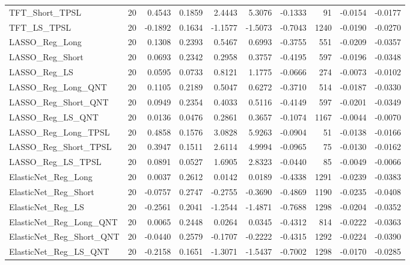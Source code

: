 \begin{tabular}{llrrrrrrrr}
\cline{1-10}
TFT\_Short\_TPSL & 20 & 0.4543 & 0.1859 & 2.4443 & 5.3076 & -0.1333 & 91 & -0.0154 & -0.0177 \\
\cline{1-10}
TFT\_LS\_TPSL & 20 & -0.1892 & 0.1634 & -1.1577 & -1.5073 & -0.7043 & 1240 & -0.0190 & -0.0270 \\
\cline{1-10}
LASSO\_Reg\_Long & 20 & 0.1308 & 0.2393 & 0.5467 & 0.6993 & -0.3755 & 551 & -0.0209 & -0.0357 \\
\cline{1-10}
LASSO\_Reg\_Short & 20 & 0.0693 & 0.2342 & 0.2958 & 0.3757 & -0.4195 & 597 & -0.0196 & -0.0348 \\
\cline{1-10}
LASSO\_Reg\_LS & 20 & 0.0595 & 0.0733 & 0.8121 & 1.1775 & -0.0666 & 274 & -0.0073 & -0.0102 \\
\cline{1-10}
LASSO\_Reg\_Long\_QNT & 20 & 0.1105 & 0.2189 & 0.5047 & 0.6272 & -0.3710 & 514 & -0.0187 & -0.0330 \\
\cline{1-10}
LASSO\_Reg\_Short\_QNT & 20 & 0.0949 & 0.2354 & 0.4033 & 0.5116 & -0.4149 & 597 & -0.0201 & -0.0349 \\
\cline{1-10}
LASSO\_Reg\_LS\_QNT & 20 & 0.0136 & 0.0476 & 0.2861 & 0.3657 & -0.1074 & 1167 & -0.0044 & -0.0070 \\
\cline{1-10}
LASSO\_Reg\_Long\_TPSL & 20 & 0.4858 & 0.1576 & 3.0828 & 5.9263 & -0.0904 & 51 & -0.0138 & -0.0166 \\
\cline{1-10}
LASSO\_Reg\_Short\_TPSL & 20 & 0.3947 & 0.1511 & 2.6114 & 4.9994 & -0.0965 & 75 & -0.0130 & -0.0162 \\
\cline{1-10}
LASSO\_Reg\_LS\_TPSL & 20 & 0.0891 & 0.0527 & 1.6905 & 2.8323 & -0.0440 & 85 & -0.0049 & -0.0066 \\
\cline{1-10}
ElasticNet\_Reg\_Long & 20 & 0.0037 & 0.2612 & 0.0142 & 0.0189 & -0.4338 & 1291 & -0.0239 & -0.0383 \\
\cline{1-10}
ElasticNet\_Reg\_Short & 20 & -0.0757 & 0.2747 & -0.2755 & -0.3690 & -0.4869 & 1190 & -0.0235 & -0.0408 \\
\cline{1-10}
ElasticNet\_Reg\_LS & 20 & -0.2561 & 0.2041 & -1.2544 & -1.4871 & -0.7688 & 1298 & -0.0204 & -0.0352 \\
\cline{1-10}
ElasticNet\_Reg\_Long\_QNT & 20 & 0.0065 & 0.2448 & 0.0264 & 0.0345 & -0.4312 & 814 & -0.0222 & -0.0363 \\
\cline{1-10}
ElasticNet\_Reg\_Short\_QNT & 20 & -0.0440 & 0.2579 & -0.1707 & -0.2222 & -0.4315 & 1292 & -0.0224 & -0.0390 \\
\cline{1-10}
ElasticNet\_Reg\_LS\_QNT & 20 & -0.2158 & 0.1651 & -1.3071 & -1.5437 & -0.7002 & 1298 & -0.0170 & -0.0285 \\

\end{tabular}
